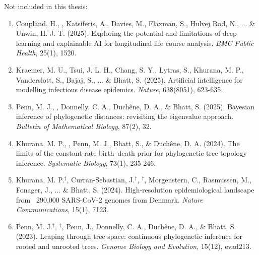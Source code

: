 Not included in this thesis:
\begin{enumerate}[itemsep=1pt, topsep=0pt]
    \item Coupland, H., , Katsiferis, A., Davies, M., Flaxman, S., Hulvej Rod, N., ... \& Unwin, H. J. T. (2025). Exploring the potential and limitations of deep learning and explainable AI for longitudinal life course analysis. \textit{BMC Public Health}, 25(1), 1520.
    \item Kraemer, M. U., Tsui, J. L. H., Chang, S. Y., Lytras, S., Khurana, M. P., Vanderslott, S., Bajaj, S.,  ... \& Bhatt, S. (2025). Artificial intelligence for modelling infectious disease epidemics. \textit{Nature}, 638(8051), 623-635.
    \item Penn, M. J., , Donnelly, C. A., Duchêne, D. A., \& Bhatt, S. (2025). Bayesian inference of phylogenetic distances: revisiting the eigenvalue approach. \textit{Bulletin of Mathematical Biology}, 87(2), 32.
    \item Khurana, M. P., , Penn, M. J., Bhatt, S., \& Duchêne, D. A. (2024). The limits of the constant-rate birth–death prior for phylogenetic tree topology inference. \textit{Systematic Biology}, 73(1), 235-246.
    \item Khurana, M. P.$^{\dagger}$, Curran-Sebastian, J.$^{\dagger}$, $^{\dagger}$, Morgenstern, C., Rasmussen, M., Fonager, J., ... \& Bhatt, S. (2024). High-resolution epidemiological landscape from~ 290,000 SARS-CoV-2 genomes from Denmark. \textit{Nature Communications}, 15(1), 7123.
    \item Penn, M. J.$^{\dagger}$, $^{\dagger}$, Penn, J., Donnelly, C. A., Duchêne, D. A., \& Bhatt, S. (2023). Leaping through tree space: continuous phylogenetic inference for rooted and unrooted trees. \textit{Genome Biology and Evolution}, 15(12), evad213.
\end{enumerate}